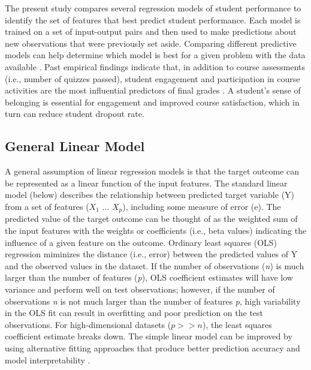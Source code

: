\documentclass[sigconf]{acmart}
\begin{document}

The present study compares several regression models of student performance 
to identify the set of features that best predict student performance. Each 
model is trained on a set of input-output pairs and then used to make 
predictions about new observations that were previously set aside. Comparing 
different predictive models can help determine which model is best for a given 
problem with the data available \cite{raschka17}. Past empirical findings 
indicate that, in addition to course assessments (i.e., number of quizzes 
passed), student engagement and participation in course activities are the most 
influential predictors of final grades \cite{Papamitsiou14, romerozaldivar12}. 
A student's sense of belonging is essential for engagement and improved course 
satisfaction, which in turn can reduce student dropout rate. 

\subsection{General Linear Model} 

A general assumption of linear regression models is that the target outcome
can be represented as a linear function of the input features. The standard 
linear model (below) describes the relationship between predicted target 
variable (Y) from a set of features ($X_1$ ... $X_p$), including some measure 
of error (e). The predicted value of the target outcome can be thought of as 
the weighted sum of the input features with the weights or coefficients 
(i.e., beta values) indicating the influence of a given feature on the outcome. 
Ordinary least squares (OLS) regression miminizes the distance (i.e., error) 
between the predicted values of Y and the observed values in the dataset. 
If the number of observations (\textit{n}) is much larger than the number of 
features (\textit{p}), OLS coefficient estimates will have low variance and 
perform well on test observations; however, if the number of observations 
\textit{n} is not much larger than the number of features \textit{p}, high 
variability in the OLS fit can result in overfitting and poor prediction on 
the test observations. For high-dimensional datasets (\textit{$p>>n$}), 
the least squares coefficient estimate breaks down. The simple linear model 
can be improved by using alternative fitting approaches that produce better 
prediction accuracy and model interpretability \cite{jamesetal13}. 
\end{document}
